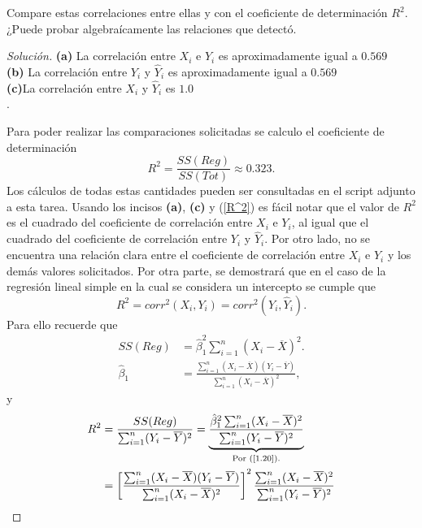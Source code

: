 \documentclass[10.5pt,notitlepage]{article}
\newenvironment{solucion}
  {\begin{proof}[Solución]}
  {\end{proof}}
\newcommand{\corch}[1]{\left[ #1 \right]}
\begin{document}
Compare estas correlaciones entre ellas y con el coeficiente de determinación \(R^2\). ¿Puede probar algebraícamente las relaciones que detectó.
\begin{solucion}
\noindent\textbf{(a)} La correlación entre \(X_i\) e \(Y_i\) es aproximadamente igual a \(0.569\)\\

\noindent\textbf{(b)} La correlación entre \(Y_i\) y \(\hat{Y}_i\) es aproximadamente igual a \(0.569\)\\ 

\noindent\textbf{(c)}La correlación entre \(X_i\) y \(\hat{Y}_i\) es \(1.0\)\\.

\noindent Para poder realizar las comparaciones solicitadas se calculo el coeficiente de determinación 
\begin{equation}\label{R^2}
    R^2 = \frac{SS(Reg)}{SS(Tot)} \approx 0.323.
\end{equation}
Los cálculos de todas estas cantidades pueden ser consultadas en el script adjunto a esta tarea. Usando los incisos \textbf{(a)}, \textbf{(c)} y (\ref{R^2}) es fácil notar que el valor de \(R^2\) es el cuadrado del coeficiente de correlación entre \(X_i\) e \(Y_i\), al igual que el cuadrado del coeficiente de correlación entre \(Y_i\) y \(\hat{Y}_i\). Por otro lado, no se encuentra una relación clara entre el coeficiente de correlación entre \(X_i\) e \(\hat{Y}_i\) y los demás valores solicitados. Por otra parte, se demostrará que en el caso de la regresión lineal simple en la cual se considera un intercepto se cumple que \[R^2 = corr^2(X_i,Y_i) = corr^2(Y_i,\hat{Y}_i).\] Para ello recuerde que 
\begin{align}
    SS(Reg) &= \hat{\beta}_{1}^{2}\sum_{i=1}^{n}(X_i - \overline{X})^2.\nonumber\\ 
    \hat{\beta}_1  &= \frac{\sum_{i = 1}^{n}(X_i - \overline{X})(Y_i - \overline{Y})}{\sum_{i = 1}^{n}(X_i - \overline{X})^2}, \label{1.20}
\end{align}
y 
\begin{align}
    R^2 &= \frac{SS(Reg)}{\sum_{i = 1}^{n}(Y_i - \overline{Y})^2} = \underbrace{\frac{\hat{\beta}_{1}^{2}\sum_{i=1}^{n}(X_i - \overline{X})^2}{\sum_{i = 1}^{n}(Y_i - \overline{Y})^2}}_{\text{Por (\ref{1.20}).}}\nonumber\\ 
        &= \corch{\frac{\sum_{i = 1}^{n}(X_i - \overline{X})(Y_i - \overline{Y})}{\sum_{i = 1}^{n}(X_i - \overline{X})^2}}^2\frac{\sum_{i=1}^{n}(X_i - \overline{X})^2}{\sum_{i=1}^{n}(Y_i - \overline{Y})^2}\nonumber\\ 

\end{align}
\end{solucion}
\end{document}

